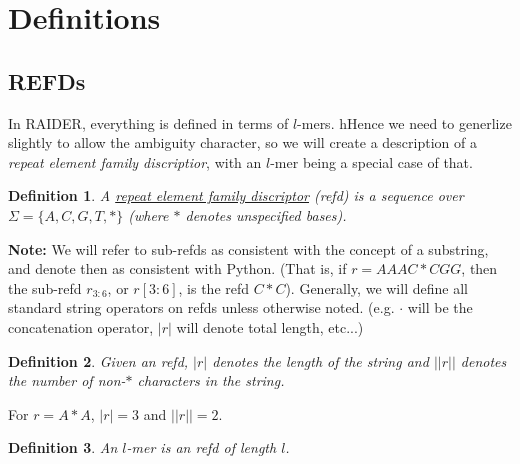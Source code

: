 \documentclass{article}
\newtheorem{definition}{Definition}
\begin{document}
\section{Definitions}

\subsection{REFDs}
In RAIDER, everything is defined in terms of $l$-mers.  hHence we need
to generlize slightly to allow the ambiguity character, so we will
create a description of a {\it repeat element family discriptior},
with an $l$-mer being a special case of that.

\begin{definition}
A \underline{repeat element family discriptor} (refd) is a sequence over
$\Sigma=\{A,C,G,T,*\}$ (where $*$ denotes unspecified bases).
\end{definition}

{\bf Note:} We will refer to sub-refds as consistent with the concept
of a substring, and denote then as consistent with Python.  (That is,
if $r =  AAAC*CGG$, then the sub-refd $r_{3:6}$, or $r[3:6]$, is the refd
$C*C$).  Generally, we will define all standard string operators on
refds unless otherwise noted.  (e.g. $\cdot$ will be the concatenation
operator, $|r|$ will denote total length, etc...)

\begin{definition}
Given an refd, $|r|$ denotes the length of the string and $||r||$
denotes the number of non-$*$ characters in the string.
\end{definition}
For $r = A*A$, $|r| = 3$ and $||r|| = 2$.

\begin{definition}
An $l$-mer is an refd of length $l$.
\end{definition}
\end{document}
